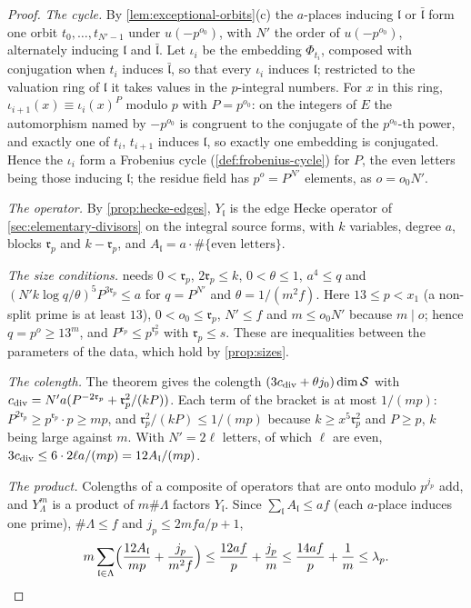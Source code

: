 \begin{proof}
\emph{The cycle.} By \cref{lem:exceptional-orbits}(c) the $a$-places inducing $\mathfrak l$ or $\bar{\mathfrak l}$ form one orbit $t_0,\dots,t_{N'-1}$ under $u(-p^{o_0})$, with $N'$ the order of $u(-p^{o_0})$, alternately inducing $\mathfrak l$ and $\bar{\mathfrak l}$. Let $\iota_i$ be the embedding $\Phi_{t_i}$, composed with conjugation when $t_i$ induces $\bar{\mathfrak l}$, so that
every $\iota_i$ induces $\mathfrak l$; restricted to the valuation ring of $\mathfrak l$ it takes values in the $p$-integral numbers. For $x$ in this ring, $\iota_{i+1}(x)\equiv\iota_i(x)^{P}$ modulo $p$ with $P=p^{o_0}$: on the integers of $E$ the automorphism named by $-p^{o_0}$ is congruent to the conjugate of the $p^{o_0}$-th power, and exactly one of
$t_i$, $t_{i+1}$ induces $\mathfrak l$, so exactly one embedding is conjugated. Hence the $\iota_i$ form a Frobenius cycle (\cref{def:frobenius-cycle}) for $P$, the even letters being those inducing $\mathfrak l$; the residue field has $p^o=P^{N'}$ elements, as $o=o_0N'$.

\emph{The operator.} By \cref{prop:hecke-edges}, $Y_{\mathfrak l}$ is the edge Hecke operator of \cref{sec:elementary-divisors} on the integral source forms, with $k$ variables, degree $a$, blocks $\mathfrak r_p$ and $k-\mathfrak r_p$, and $A_{\mathfrak l}=a\cdot\#\{\text{even letters}\}$.

\emph{The size conditions.}  needs $0<\mathfrak r_p$, $2\mathfrak r_p\le k$, $0<\theta\le1$, $a^4\le q$ and $(N'k\log q/\theta)^5P^{3\mathfrak r_p}\le a$ for $q=P^{N'}$ and $\theta=1/(m^2f)$. Here $13\le p<x_1$ (a non-split prime is at least $13$), $0<o_0\le\mathfrak r_p$, $N'\le f$ and $m\le o_0N'$ because $m\mid o$; hence $q=p^o\ge13^m$, and
$P^{\mathfrak r_p}\le p^{\mathfrak r_p^2}$ with $\mathfrak r_p\le s$. These are inequalities between the parameters of the data, which hold by \cref{prop:sizes}.

\emph{The colength.} The theorem gives the colength $(3c_{\rm div}+\theta j_0)\dim\mathcal S$ with $c_{\rm div}=N'a(P^{-2\mathfrak r_p}+\mathfrak r_p^2/(kP))$. Each term of the bracket is at most $1/(mp)$: $P^{2\mathfrak r_p}\ge p^{\mathfrak r_p}\cdot p\ge mp$, and $\mathfrak r_p^2/(kP)\le1/(mp)$ because $k\ge x^5\mathfrak r_p^2$ and $P\ge p$, $k$ being
large against $m$. With $N'=2\ell$ letters, of which $\ell$ are even, $3c_{\rm div}\le6\cdot2\ell a/(mp)=12A_{\mathfrak l}/(mp)$.

\emph{The product.} Colengths of a composite of operators that are onto modulo $p^{j_p}$ add, and $Y_\Lambda^m$ is a product of $m\#\Lambda$ factors $Y_{\mathfrak l}$. Since $\sum_{\mathfrak l}A_{\mathfrak l}\le af$ (each $a$-place induces one prime), $\#\Lambda\le f$ and $j_p\le2mfa/p+1$,
\[
  m\sum_{\mathfrak l\in\Lambda}\Bigl(\frac{12A_{\mathfrak l}}{mp}+\frac{j_p}{m^2f}\Bigr)\le\frac{12af}p+\frac{j_p}m\le\frac{14af}p+\frac1m\le\lambda_p .
\]
\end{proof}

